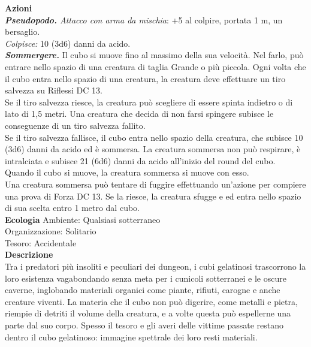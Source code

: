 \begin{multicols}{2}
\smallskip\textbf{Azioni}\\

\emph{\textbf{Pseudopodo.} Attacco con arma da mischia}: +5 al colpire, portata 1 m, un bersaglio.\\

\emph{Colpisce:} 10 (3d6) danni da acido.\\

\emph{\textbf{Sommergere.}} Il cubo si muove fino al massimo della sua velocità. Nel farlo, può entrare nello spazio di una creatura di taglia Grande o più piccola. Ogni volta che il cubo entra nello spazio di una creatura, la creatura deve effettuare un tiro salvezza su Riflessi DC  13.\\

Se il tiro salvezza riesce, la creatura può scegliere di essere spinta indietro o di lato di 1,5 metri. Una creatura che decida di non farsi spingere subisce le conseguenze di un tiro salvezza fallito.\\

Se il tiro salvezza fallisce, il cubo entra nello spazio della creatura, che subisce 10 (3d6) danni da acido ed è sommersa. La creatura sommersa non può respirare, è intralciata e subisce 21 (6d6) danni da acido all'inizio del round del cubo. Quando il cubo si muove, la creatura sommersa si muove con esso.\\

Una creatura sommersa può tentare di fuggire effettuando un'azione per compiere una prova di Forza DC  13. Se la riesce, la creatura sfugge e ed entra nello spazio di sua scelta entro 1 metro dal cubo.\\
\textbf{Ecologia}
Ambiente: Qualsiasi sotterraneo\\
Organizzazione: Solitario\\
Tesoro: Accidentale\\
\textbf{Descrizione}\\
Tra i predatori più insoliti e peculiari dei dungeon, i cubi gelatinosi trascorrono la loro esistenza vagabondando senza meta per i cunicoli sotterranei e le oscure caverne, inglobando materiali organici come piante, rifiuti, carogne e anche creature viventi. La materia che il cubo non può digerire, come metalli e pietra, riempie di detriti il volume della creatura, e a volte questa può espellerne una parte dal suo corpo. Spesso il tesoro e gli averi delle vittime passate restano dentro il cubo gelatinoso: immagine spettrale dei loro resti materiali.\\


\end{multicols}
